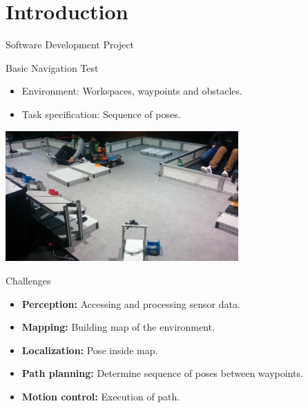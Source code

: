 
\section{Introduction}
\begin{frame}{Software Development Project}
\end{frame}

\begin{frame}{Basic Navigation Test}
\begin{itemize}
    \item Environment: Workspaces, waypoints and obstacles.
    \item Task specification: Sequence of poses.
\end{itemize}
\centering \includegraphics[height=50mm]{gfx/arena.jpg}
\end{frame}

\begin{frame}{Challenges}
\begin{itemize}
    \item \textbf{Perception:} Accessing and processing sensor data.
    \item \textbf{Mapping:} Building map of the environment.
    \item \textbf{Localization:} Pose inside map.
    \item \textbf{Path planning:} Determine sequence of poses between waypoints.
    \item \textbf{Motion control:} Execution of path.
\end{itemize}
\end{frame}

